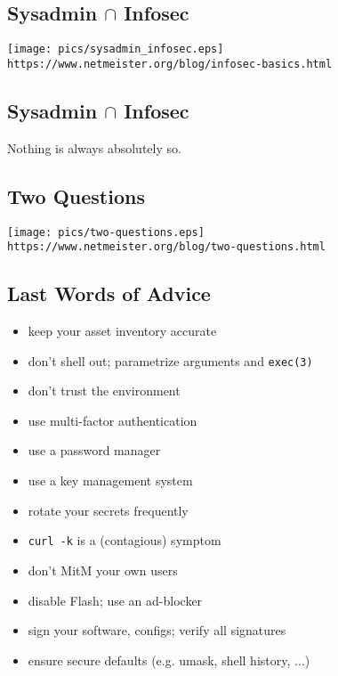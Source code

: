 \documentclass[xga]{xdvislides}
\begin{document}
\subsection{Sysadmin $\cap$ Infosec}
\vspace*{\fill}
\begin{center}
	\texttt{[image: pics/sysadmin\_infosec.eps]} \\
	\verb+https://www.netmeister.org/blog/infosec-basics.html+
\end{center}
\vspace*{\fill}

\subsection{Sysadmin $\cap$ Infosec}
\vspace*{\fill}
\Huge
\begin{center}
	Nothing is always absolutely so.
\end{center}
\Normalsize
\vspace*{\fill}

\subsection{Two Questions}
\vspace*{\fill}
\begin{center}
	\texttt{[image: pics/two-questions.eps]} \\
\small
	\verb+https://www.netmeister.org/blog/two-questions.html+
\end{center}
\Normalsize
\vspace*{\fill}

\subsection{Last Words of Advice}
\begin{itemize}
	\item keep your asset inventory accurate
	\item don't shell out; parametrize arguments and {\tt exec(3)}
	\item don't trust the environment
	\item use multi-factor authentication
	\item use a password manager
	\item use a key management system
	\item rotate your secrets frequently
	\item {\tt curl -k} is a (contagious) symptom
	\item don't MitM your own users
	\item disable Flash; use an ad-blocker
	\item sign your software, configs; verify all signatures
	\item ensure secure defaults (e.g. umask, shell history, ...)
\end{itemize}
\end{document}
